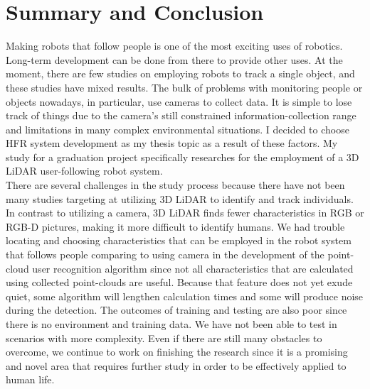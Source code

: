 \section{Summary and Conclusion}
\label{summa_conc}

Making robots that follow people is one of the most exciting uses of robotics. 
Long-term development can be done from there to provide other uses. At the moment, 
there are few studies on employing robots to track a single object, and these studies 
have mixed results.
The bulk of problems with monitoring people or objects nowadays, in particular, 
use cameras to collect data. It is simple to lose track of things due to the camera's 
still constrained information-collection range and limitations in many complex 
environmental situations. I decided to choose HFR system development as my thesis topic 
as a result of these factors. My study for a graduation project specifically researches 
for the employment of a 3D LiDAR user-following robot system.\\

There are several challenges in the study process because there have not been many studies targeting at 
utilizing 3D LiDAR to identify and track individuals. In contrast to utilizing a 
camera, 3D LiDAR finds fewer characteristics in RGB or RGB-D pictures, making it 
more difficult to identify humans. We had trouble locating and choosing 
characteristics that can be employed in the robot system that follows people 
comparing to using camera in the development of the point-cloud 
user recognition algorithm since not all characteristics that are calculated using 
collected point-clouds are useful. Because that feature does not yet exude 
quiet, some algorithm will lengthen calculation times and some will produce noise during the detection. 
The outcomes of training and testing are also poor since there is no environment 
and training data. We have not been able to test in scenarios with more complexity. 
Even if there are still many obstacles to overcome, we continue to work on 
finishing the research since it is a promising and novel area that requires 
further study in order to be effectively applied to human life.\\

